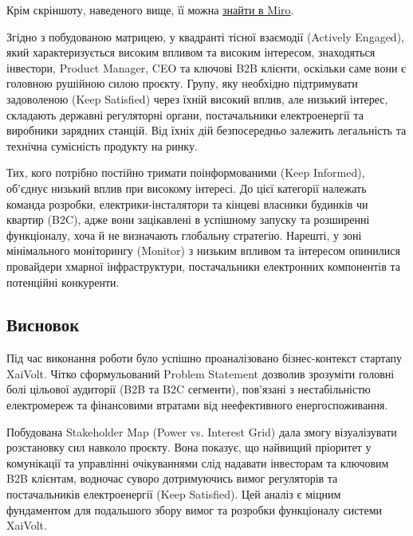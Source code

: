 \documentclass[14pt, a4paper]{extreport}
\begin{document}
	
	Крім скріншоту, наведеного вище, її можна \href{https://miro.com/app/board/uXjVHgPsEzs=/?share_link_id=876354643353}{знайти в Miro}.
	
	Згідно з побудованою матрицею, у квадранті тісної взаємодії (Actively Engaged), який характеризується високим впливом та високим інтересом, знаходяться інвестори, Product Manager, CEO та ключові B2B клієнти, оскільки саме вони є головною рушійною силою проєкту. Групу, яку необхідно підтримувати задоволеною (Keep Satisfied) через їхній високий вплив, але низький інтерес, складають державні регуляторні органи, постачальники електроенергії та виробники зарядних станцій. Від їхніх дій безпосередньо залежить легальність та технічна сумісність продукту на ринку. 
	
	Тих, кого потрібно постійно тримати поінформованими (Keep Informed), об'єднує низький вплив при високому інтересі. До цієї категорії належать команда розробки, електрики-інсталятори та кінцеві власники будинків чи квартир (B2C), адже вони зацікавлені в успішному запуску та розширенні функціоналу, хоча й не визначають глобальну стратегію. Нарешті, у зоні мінімального моніторингу (Monitor) з низьким впливом та інтересом опинилися провайдери хмарної інфраструктури, постачальники електронних компонентів та потенційні конкуренти.
	
	\subsection*{Висновок}
	
	Під час виконання роботи було успішно проаналізовано бізнес-контекст стартапу XaiVolt. Чітко сформульований Problem Statement дозволив зрозуміти головні болі цільової аудиторії (B2B та B2C сегменти), пов'язані з нестабільністю електромереж та фінансовими втратами від неефективного енергоспоживання. 
	
	Побудована Stakeholder Map (Power vs. Interest Grid) дала змогу візуалізувати розстановку сил навколо проєкту. Вона показує, що найвищий пріоритет у комунікації та управлінні очікуваннями слід надавати інвесторам та ключовим B2B клієнтам, водночас суворо дотримуючись вимог регуляторів та постачальників електроенергії (Keep Satisfied). Цей аналіз є міцним фундаментом для подальшого збору вимог та розробки функціоналу системи XaiVolt.
	
\end{document}
